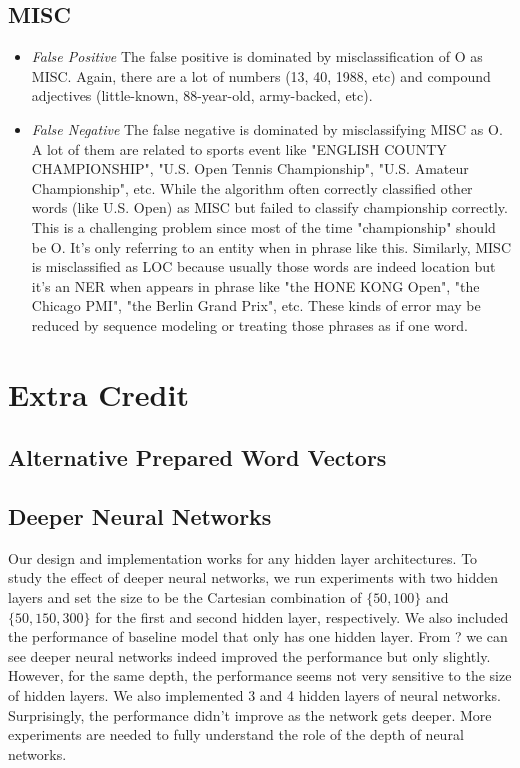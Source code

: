 \documentclass[11pt, oneside]{article}   	%
\begin{document}
\subsection{MISC}

\begin{itemize}
\item \emph{False Positive}
The false positive is dominated by misclassification of O as MISC. Again, there are a lot of numbers (13, 40, 1988, etc)  and compound adjectives (little-known, 88-year-old, army-backed, etc). 

\item \emph{False Negative} 
The false negative is dominated by misclassifying MISC as O. A lot of them are related to sports event like "ENGLISH COUNTY CHAMPIONSHIP", "U.S. Open Tennis Championship",  "U.S. Amateur Championship", etc.  While the algorithm often correctly classified other words (like U.S. Open) as MISC but failed to classify championship correctly. This is a challenging problem since most of the time "championship" should be O. It's only referring to an entity when in phrase like this. Similarly, MISC is misclassified as LOC because usually those words are indeed location but it's an NER when appears in phrase like "the HONE KONG Open", "the Chicago PMI", "the Berlin Grand Prix", etc. These kinds of error may be reduced by sequence modeling or treating those phrases as if one word. 

\end{itemize}




\section{Extra Credit}
\subsection{Alternative Prepared Word Vectors}


\subsection{Deeper Neural Networks}
Our design and implementation works for any hidden layer architectures. To study the effect of deeper neural networks, we run experiments with two hidden layers and set the size to be the Cartesian combination of $\{50, 100\}$ and $\{50, 150, 300\}$ for the first and second hidden layer, respectively. We also included the performance of baseline model that only has one hidden layer. From ? we can see deeper neural networks indeed improved the performance but only slightly. However, for the same depth, the performance seems not very sensitive to the size of hidden layers. We also implemented 3 and 4 hidden layers of neural networks. Surprisingly, the performance didn't improve as the network gets deeper. More experiments are needed to fully understand the role of the depth of neural networks.
\end{document}
